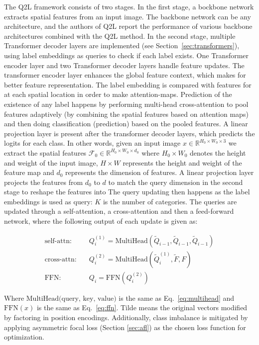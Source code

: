 \documentclass[lettersize,journal]{IEEEtran}
\begin{document}
The Q2L framework consists of two stages. In the first stage, a bockbone network extracts spatial features from an input image. The backbone network can be any architecture, and the authors of Q2L report the performance of various backbone architectures combined with the Q2L method. In the second stage, multiple Transformer decoder layers are implemented (see Section~\ref{sec:transformers}), using label embeddings as queries to check if each label exists. One Transformer encoder layer and two Transformer decoder layers handle feature updates. The transformer encoder layer enhances the global feature context, which makes for better feature representation. The label embedding is compared with features for at each spatial location in order to make attention-maps. Prediction of the existence of any label happens by performing multi-head cross-attention to pool features adaptively (by combining the spatial features based on attention maps) and then doing classification (prediction) based on the pooled features. A linear projection layer is present after the transformer decoder layers, which predicts the logits for each class. In other words, given an input image $x\in \mathbb{R}^{H_0\times W_0\times 3}$ we extract the spatial features $\mathcal{F}_0\in \mathbb{R}^{H_0\times W_0\times d_0}$ where $H_0 \times W_0$ denotes the height and weight of the input image, $H \times W$ represents the height and weight of the feature map and $d_0$ represents the dimension of features. A linear projection layer projects the features from $d_0$ to $d$ to match the query dimension in the second stage to reshape the features into 
The query updating then happens as the label embeddings is used as query: 
$K$ is the number of categories. The queries are updated through a self-attention, a cross-attention and then a feed-forward network, where the following output of each update is given as:

\begin{equation}
    \begin{aligned}
    \text{self-attn:} \quad & Q^{(1)}_i = \text{MultiHead}(\tilde{Q}_{i-1}, \tilde{Q}_{i-1}, \tilde{Q}_{i-1}) \\
    \text{cross-attn:} \quad & Q^{(2)}_i = \text{MultiHead}(\tilde{Q}^{(1)}_i, \tilde{F}, F) \\
    \text{FFN:} \quad & Q_i = \text{FFN}(Q^{(2)}_i)
    \end{aligned}
\end{equation}

Where $\text{MultiHead(query, key, value)}$ is the same as Eq.~\ref{eq:multihead} and $\text{FFN}(x)$ is the same as Eq.~\ref{eq:ffn}. Tilde means the original vectors modified by factoring in position encodings. Additionally, class imbalance is mitigated by applying asymmetric focal loss (Section \ref{sec:afl}) as the chosen loss function for optimization.
\end{document}
